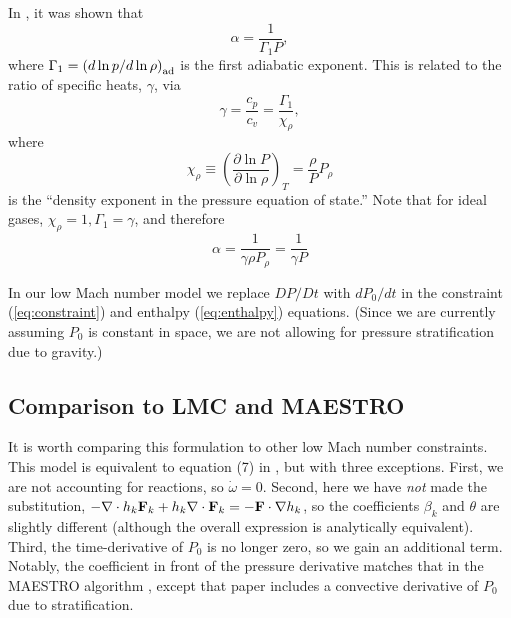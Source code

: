 \documentclass[final]{siamltex}
\def\Fb {{\bf F}}
\begin{document}
In \cite{MAESTROI}, it was shown that
\begin{equation}
\alpha = \frac{1}{\Gamma_1 P},
\end{equation}
where $\Gamma_1 = \left(d\ln{p}/d\ln{\rho}\right)_{\rm ad}$ is the first 
adiabatic exponent.  This is related to the ratio of specific heats, 
$\gamma$, via
\begin{equation}
\gamma = \frac{c_p}{c_v} = \frac{\Gamma_1}{\chi_\rho},
\end{equation}
where
\begin{equation}
\chi_\rho \equiv \left(\frac{\partial\ln{P}}{\partial\ln{\rho}}\right)_T = \frac{\rho}{P}P_\rho
\end{equation}
is the ``density exponent in the pressure equation of state.''
Note that for ideal gases, $\chi_\rho=1, \Gamma_1=\gamma$, and therefore
\begin{equation}
\alpha = \frac{1}{\gamma\rho P_\rho} = \frac{1}{\gamma P}
\end{equation}

In our low Mach number model we replace $DP/Dt$ with $dP_0/ dt$ in the 
constraint (\ref{eq:constraint}) and enthalpy (\ref{eq:enthalpy}) equations.
(Since we are currently assuming $P_0$ is constant in space,
we are not allowing for pressure stratification due to gravity.)

\subsection{Comparison to LMC and MAESTRO}
It is worth comparing this formulation to other low Mach number constraints.
This model is equivalent to equation (7) in \cite{DayBell:2000},
but with three exceptions.  First,
we are not accounting for reactions, so $\dot\omega=0$.  Second, here we have 
{\it not} made the substitution, 
$-\nabla\cdot h_k\Fb_k + h_k\nabla\cdot\Fb_k = -\Fb\cdot\nabla h_k$, so the coefficients
$\beta_k$ and $\theta$ are slightly different (although the overall expression is
analytically equivalent).  Third, the time-derivative of $P_0$ is no longer zero,
so we gain an additional term.  Notably, the coefficient in front of the pressure 
derivative matches that in the MAESTRO algorithm \cite{MAESTROIII},
except that paper includes a convective derivative of $P_0$ due to stratification.
\end{document}

